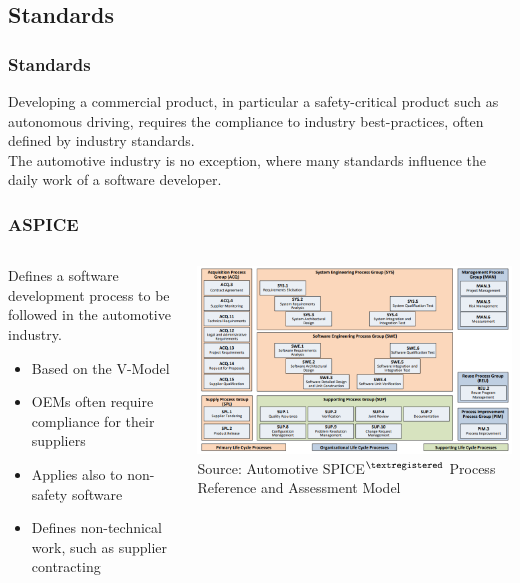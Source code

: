 \subsection{Standards}

\begin{frame}
\frametitle{Standards}
Developing a commercial product, in particular a safety-critical product such
as autonomous driving, requires the compliance to industry best-practices,
often defined by industry standards.\\

The automotive industry is no exception, where many standards influence the
daily work of a software developer.
\end{frame}

\begin{frame}
\frametitle{ASPICE}
\begin{columns}[T]
    \begin{column}{0.4\textwidth}
        Defines a software development process to be followed in the automotive
        industry.\\
        \begin{itemize}
            \item Based on the V-Model
            \item OEMs often require compliance for their suppliers
            \item Applies also to non-safety software
            \item Defines non-technical work, such as supplier contracting
        \end{itemize}
    \end{column}
    \begin{column}{0.6\textwidth}
        \centering
        \includegraphics[width=\textwidth]{images/aspice.png}\\
        \footnotesize Source: Automotive SPICE$^{\tiny{\textregistered}}$
            Process Reference and Assessment Model\footnotemark[1]
    \end{column}
\end{columns}
\end{frame}

